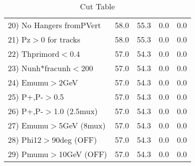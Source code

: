 \begin{table}[h!]
\begin{tabular}{||l||r|r|r|r||}
 20) No Hangers fromPVert &        58.0 &        55.3 &         0.0 &         0.0 \\
 21) Pz$>$0 for tracks    &        58.0 &        55.3 &         0.0 &         0.0 \\
 22) Thprimord$<$0.4      &        57.0 &        54.3 &         0.0 &         0.0 \\
 23) Nunh*fracunh$<$200   &        57.0 &        54.3 &         0.0 &         0.0 \\
 24) Emumu$>$2GeV         &        57.0 &        54.3 &         0.0 &         0.0 \\
 25) P+,P-$>$0.5          &        57.0 &        54.3 &         0.0 &         0.0 \\
 26) P+,P-$>$1.0 (2.5mux) &        57.0 &        54.3 &         0.0 &         0.0 \\
 27) Emumu$>$5GeV  (8mux) &        57.0 &        54.3 &         0.0 &         0.0 \\
 28) Phi12$>$90deg  (OFF) &        57.0 &        54.3 &         0.0 &         0.0 \\
 29) Pmumu$>$10GeV  (OFF) &        57.0 &        54.3 &         0.0 &         0.0 \\
 \hline
 \hline
 \end{tabular}
 \caption{Cut Table \cohjp  }
 \label{tab-cut__jpsi}
 \end{table}
